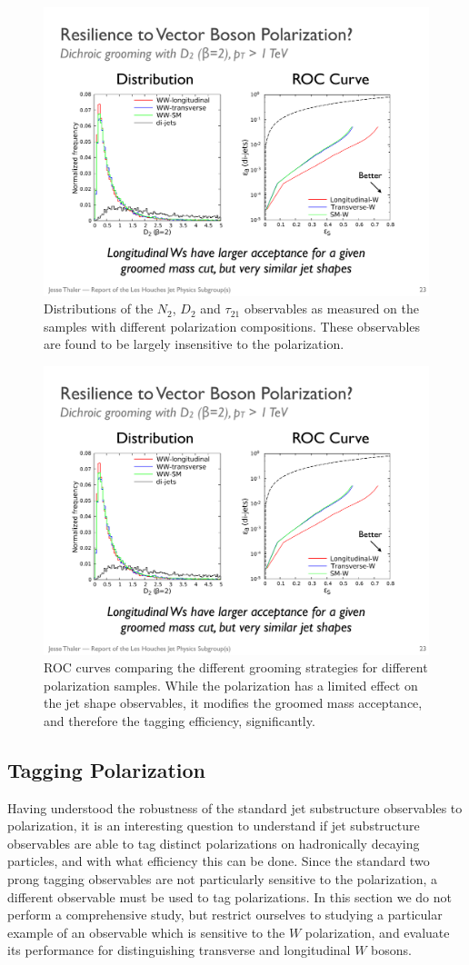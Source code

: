 \documentclass[11pt,letterpaper]{article}
\begin{document}
\begin{figure}
\begin{center}
\includegraphics[width=0.3\columnwidth]{figures/D2_polarization}
\end{center}
\caption{Distributions of the $N_2$, $D_2$ and $\tau_{21}$ observables as measured on the samples with different polarization compositions. These observables are found to be largely insensitive to the polarization.}
\end{figure}

\begin{figure}
\begin{center}
\includegraphics[width=0.3\columnwidth]{figures/ROC_polarization}
\end{center}
\caption{ROC curves comparing the different grooming strategies for different polarization samples. While the polarization has a limited effect on the jet shape observables, it modifies the groomed mass acceptance, and therefore the tagging efficiency, significantly.}
\end{figure}

\subsection{Tagging Polarization}\label{sec:polar_tag}



Having understood the robustness of the standard jet substructure observables to polarization, it is an interesting question to understand if jet substructure observables are able to tag distinct polarizations on hadronically decaying particles, and with what efficiency this can be done. Since the standard two prong tagging observables are not particularly sensitive to the polarization, a different observable must be used to tag polarizations. In this section we do not perform a comprehensive study, but restrict ourselves to studying a particular example of an observable which is sensitive to the $W$ polarization, and evaluate its performance for distinguishing transverse and longitudinal $W$ bosons. 
\end{document}
